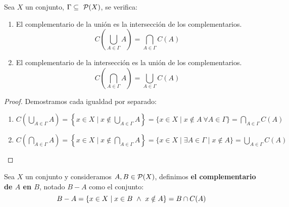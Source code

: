 \begin{prop}
    Sea $X$ un conjunto, $\Gamma \subseteq~\mathcal{P}(X)$, se verifica:
    \begin{enumerate}
        \item El complementario de la unión es la intersección de los complementarios.
        $$C\left( \bigcup_{A\in\Gamma}A \right) = \bigcap_{A\in\Gamma}C(A)$$

        \item El complementario de la intersección es la unión de los complementarios.
        $$C\left( \bigcap_{A\in\Gamma}A \right) = \bigcup_{A\in\Gamma}C(A)$$
    \end{enumerate}
\end{prop}
\begin{proof} Demostramos cada igualdad por separado:
\begin{enumerate}
    \item $C\left( \bigcup\limits_{A\in\Gamma}A \right) = \left\{x \in X \mid x \notin \bigcup\limits_{A\in\Gamma}A\right\} = \{x \in X \mid x \notin A ~\forall A \in \Gamma \} = \bigcap\limits_{A\in\Gamma}C(A)$

    \item $C\left( \bigcap\limits_{A\in\Gamma}A \right) = \left\{ x \in X \mid x \notin \bigcap\limits_{A\in\Gamma}A \right\} = \{x \in X \mid \exists A \in \Gamma \mid x \notin A\} = \bigcup\limits_{A\in\Gamma}C(A)$
\end{enumerate}
\end{proof}

\begin{definicion}
    Sea $X$ un conjunto y consideramos $A, B \in \mathcal{P}(X)$, definimos \textbf{el complementario de $A$ en $B$}, notado
    $B-A$ como el conjunto:
    $$B-A = \{x \in X \mid x \in B \ \land \  x \notin A\} = B \cap C(A)$$
\end{definicion}

